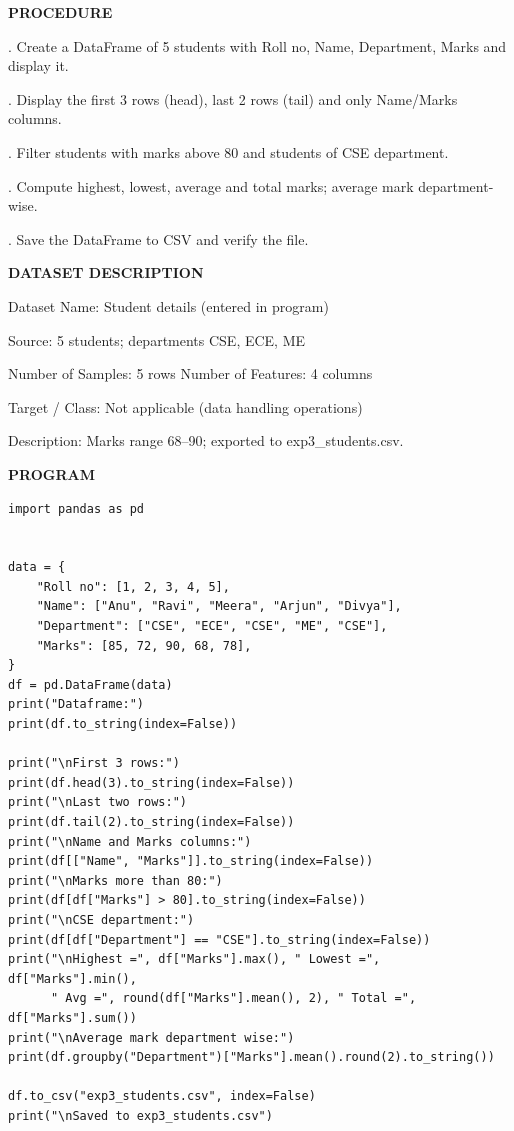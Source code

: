 \documentclass[11pt,twoside]{article}
\newcommand{\expheading}[1]{{\fontsize{14}{17}\selectfont\textbf{#1}\par}}
\newcommand{\toevenpage}{\clearpage\ifodd\value{page}\null\thispagestyle{empty}\newpage\fi}
\begin{document}
{\expheading{PROCEDURE}
\vspace{4pt}
. Create a DataFrame of 5 students with Roll no, Name, Department, Marks and display it.\par
{}. Display the first 3 rows (head), last 2 rows (tail) and only Name/Marks columns.\par
{}. Filter students with marks above 80 and students of CSE department.\par
{}. Compute highest, lowest, average and total marks; average mark department-wise.\par
{}. Save the DataFrame to CSV and verify the file. \par
\vspace{4pt}

\expheading{DATASET DESCRIPTION}
\vspace{4pt}
\noindent Dataset Name: Student details (entered in program)\par
\noindent Source: 5 students; departments CSE, ECE, ME\par
\noindent Number of Samples: 5 rows \hspace{0.3cm} Number of Features: 4 columns\par
\noindent Target / Class: Not applicable (data handling operations)\par
\noindent Description: Marks range 68--90; exported to exp3\_students.csv. \par
\vspace{4pt}
} %

\toevenpage
\expheading{PROGRAM}
\vspace{6pt}

\begin{lstlisting}
import pandas as pd


data = {
    "Roll no": [1, 2, 3, 4, 5],
    "Name": ["Anu", "Ravi", "Meera", "Arjun", "Divya"],
    "Department": ["CSE", "ECE", "CSE", "ME", "CSE"],
    "Marks": [85, 72, 90, 68, 78],
}
df = pd.DataFrame(data)
print("Dataframe:")
print(df.to_string(index=False))

print("\nFirst 3 rows:")
print(df.head(3).to_string(index=False))
print("\nLast two rows:")
print(df.tail(2).to_string(index=False))
print("\nName and Marks columns:")
print(df[["Name", "Marks"]].to_string(index=False))
print("\nMarks more than 80:")
print(df[df["Marks"] > 80].to_string(index=False))
print("\nCSE department:")
print(df[df["Department"] == "CSE"].to_string(index=False))
print("\nHighest =", df["Marks"].max(), " Lowest =", df["Marks"].min(),
      " Avg =", round(df["Marks"].mean(), 2), " Total =", df["Marks"].sum())
print("\nAverage mark department wise:")
print(df.groupby("Department")["Marks"].mean().round(2).to_string())

df.to_csv("exp3_students.csv", index=False)
print("\nSaved to exp3_students.csv")
\end{lstlisting}
\end{document}
